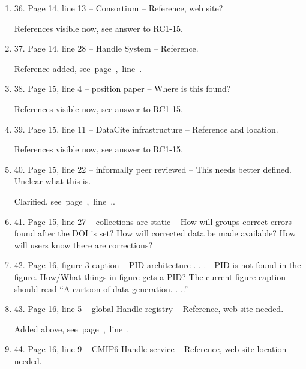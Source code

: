 \documentclass[gmd,manuscript]{copernicus}
\newcommand{\plref}[1]{\mbox{see page \pageref{p-#1}, line
    \lineref{l-#1}.}}
\newenvironment{answer}{\color{blue}}{}
\begin{document}
\begin{enumerate}[label=RC1-\arabic*,leftmargin=*]
  \begin{answer}
    References visible now, see answer to RC1-15.
  \end{answer}
\item 36. Page 14, line 13 -- Consortium -- Reference, web site?

  \begin{answer}
    References visible now, see answer to RC1-15.
  \end{answer}
\item 37. Page 14, line 28 -- Handle System -- Reference.

  \begin{answer}
    Reference added, \plref{RC1-37}
  \end{answer}
\item 38. Page 15, line 4 -- position paper -- Where is this found?

  \begin{answer}
    References visible now, see answer to RC1-15.
  \end{answer}
\item 39. Page 15, line 11 -- DataCite infrastructure -- Reference and
  location.

  \begin{answer}
    References visible now, see answer to RC1-15.
  \end{answer}
\item 40. Page 15, line 22 -- informally peer reviewed -- This needs
  better defined. Unclear what this is.

  \begin{answer}
    Clarified, \plref{RC1-40}.
  \end{answer}
\item 41. Page 15, line 27 -- collections are static -- How will groups
  correct errors found after the DOI is set? How will corrected data
  be made available? How will users know there are corrections?
\item 42. Page 16, figure 3 caption -- PID architecture . . . - PID is
  not found in the figure. How/What things in figure gets a PID? The
  current figure caption should read “A cartoon of data generation. .
  ..”
\item 43. Page 16, line 5 -- global Handle registry -- Reference, web
  site needed.

  \begin{answer}
    Added above, \plref{RC1-37}
  \end{answer}
\item 44. Page 16, line 9 -- CMIP6 Handle service -- Reference, web site
  location needed.


\end{enumerate}
\end{document}

